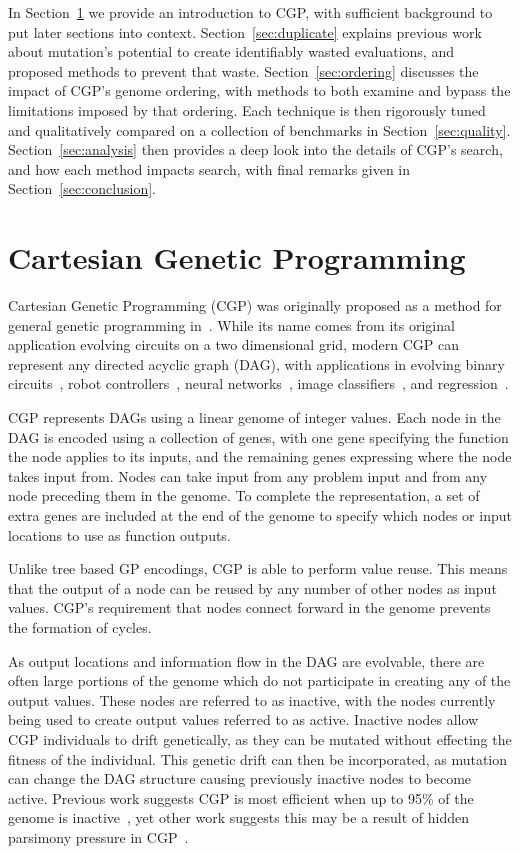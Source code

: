\documentclass[journal]{IEEEtran}
\begin{document}
In Section~\ref{sec:cgp} we provide
an introduction to CGP, with sufficient background to put later sections into
context.  Section~\ref{sec:duplicate} explains previous work about mutation's potential
to create identifiably wasted evaluations, and proposed methods to prevent that
waste.  Section~\ref{sec:ordering} discusses the impact of CGP's genome ordering,
with methods to both examine and bypass the limitations imposed by that ordering.
Each technique is then rigorously tuned and qualitatively compared on a collection
of benchmarks in Section~\ref{sec:quality}.  Section~\ref{sec:analysis} then
provides a deep look into the details of CGP's search, and how each method impacts
search, with final remarks given in Section~\ref{sec:conclusion}.


\section{Cartesian Genetic Programming}
\label{sec:cgp}
Cartesian Genetic Programming (CGP) was originally proposed as a method for general
genetic programming in~\cite{miller:2000:CGPorigin}.  While its name comes from
its original application evolving circuits on a two dimensional grid, modern CGP can
represent any directed acyclic graph (DAG), with applications in evolving binary
circuits~\cite{walker:2008:cgpmodules},
robot controllers~\cite{harding:2005:robots},
neural networks~\cite{khan:2010:cgpann},
image classifiers~\cite{harding:2012:mtcgp},
and regression~\cite{harding:2009:smcgp}.

CGP represents DAGs using a linear genome of integer values.  Each node in the
DAG is encoded using a collection of genes, with one gene specifying the function
the node applies to its inputs, and the remaining genes expressing where the
node takes input from.  Nodes can take input from any problem input and from
any node preceding them in the genome.  To complete the representation, a set
of extra genes are included at the end of the genome to specify which nodes or
input locations to use as function outputs.

Unlike tree based GP encodings, CGP is able to perform value reuse.  This means
that the output of a node can be reused by any number of other nodes as input values.
CGP's requirement that nodes connect forward in the genome prevents the formation
of cycles.

As output locations and information flow in the DAG are evolvable, there are often
large portions of the genome which do not participate in creating any of the
output values.  These nodes are referred to as inactive, with the nodes currently
being used to create output values referred to as active.  Inactive nodes
allow CGP individuals to drift genetically, as they can be mutated without effecting
the fitness of the individual.  This genetic drift can then be incorporated, as
mutation can change the DAG structure causing previously inactive nodes to become
active.  Previous work suggests CGP is most efficient when up to 95\% of the genome
is inactive~\cite{miller:2006:redundancy}, yet other work suggests this may
be a result of hidden parsimony pressure in CGP~\cite{goldman:2013:ordering}.
\end{document}
